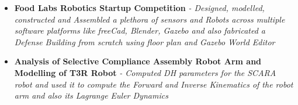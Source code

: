 \documentclass{article}
\begin{document}
\begin{itemize}




    \item{\textbf{\large{Food Labs Robotics Startup Competition}}}
          \newline
          \textit{- Designed, modelled, constructed and
              Assembled a plethora of sensors and Robots across multiple software platforms like
              freeCad, Blender, Gazebo and also fabricated a Defense Building from scratch using floor plan and Gazebo World Editor}




    \item{\textbf{\large{Analysis of Selective Compliance Assembly Robot Arm and Modelling of T3R Robot}}}
          \newline
          \textit{- Computed DH parameters for the SCARA robot and used it to compute the Forward and Inverse Kinematics of the robot arm and also its Lagrange Euler Dynamics}



\end{itemize}
\end{document}
